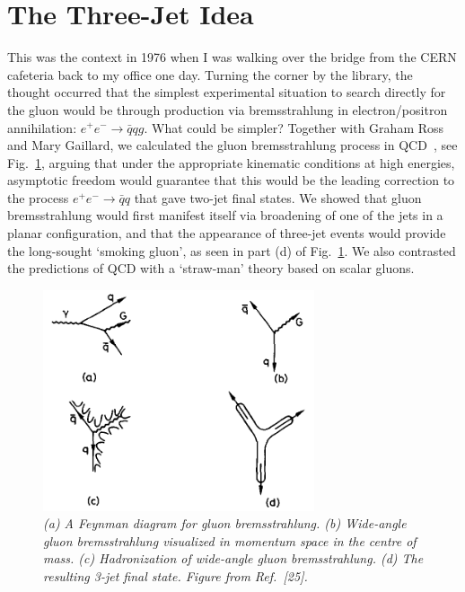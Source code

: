 \documentclass{ws-rv975x65}[12pt]
\begin{document}
\section{The Three-Jet Idea}

This was the context in 1976 when I was walking over the bridge from the CERN cafeteria
back to my office one day. Turning the corner by the library, the thought occurred that the 
simplest experimental situation to search directly for the gluon would be through production via 
bremsstrahlung in electron/positron annihilation: $e^+ e^- \to {\bar q} q g$. What could be simpler?
Together with Graham Ross and Mary Gaillard, we calculated the gluon bremsstrahlung process in QCD~\cite{EGR}, 
see Fig.~\ref{Mercedes}, arguing that under the appropriate kinematic conditions at high energies, asymptotic freedom
would guarantee that this would be the leading correction to the process $e^+ e^- \to {\bar q}q$ that
gave two-jet final states. We showed that gluon bremsstrahlung would first manifest itself via broadening
of one of the jets in a planar configuration, and that the appearance of three-jet events would
provide the long-sought `smoking gluon', as seen in part (d) of Fig.~\ref{Mercedes}.
We also contrasted the predictions of QCD with a `straw-man'
theory based on scalar gluons.

\begin{figure}[htb]
\centerline{\includegraphics[width=8cm]{Mercedes.png}}
\caption{\it (a) A Feynman diagram for gluon bremsstrahlung. (b) Wide-angle gluon bremsstrahlung
visualized in momentum space in the centre of mass. (c) Hadronization of wide-angle gluon
bremsstrahlung. (d) The resulting 3-jet final state. Figure from Ref.~[25].} \label{Mercedes}
\end{figure}
\end{document}
